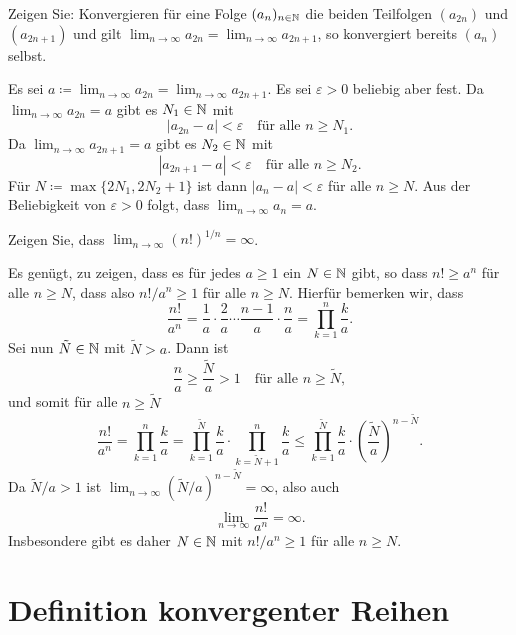 \documentclass[a4paper,10pt]{article}
\begin{document}
\begin{question}
 Zeigen Sie: Konvergieren für eine Folge $(a_n)_{n \in \mathbb{N}}$ die beiden Teilfolgen $(a_{2n})$ und $(a_{2n+1})$ und gilt $\lim_{n \to \infty} a_{2n} = \lim_{n \to \infty} a_{2n+1}$, so konvergiert bereits $(a_n)$ selbst.
\end{question}
\begin{solution}
 Es sei $a \coloneqq \lim_{n \to \infty} a_{2n} = \lim_{n \to \infty} a_{2n+1}$. Es sei $\varepsilon > 0$ beliebig aber fest. Da $\lim_{n \to \infty} a_{2n} = a$ gibt es $N_1 \in \mathbb{N}$ mit
 \[
  |a_{2n} - a| < \varepsilon \quad \text{für alle $n \geq N_1$}.
 \]
 Da $\lim_{n \to \infty} a_{2n+1} = a$ gibt es $N_2 \in \mathbb{N}$ mit
 \[
  |a_{2n+1} - a| < \varepsilon \quad \text{für alle $n \geq N_2$}.
 \]
 Für $N \coloneqq \max \{2N_1, 2N_2+1\}$ ist dann $|a_n - a| < \varepsilon$ für alle $n \geq N$. Aus der Beliebigkeit von $\varepsilon > 0$ folgt, dass $\lim_{n \to \infty} a_n = a$.
\end{solution}


\begin{question}
 Zeigen Sie, dass $\lim_{n \to \infty} (n!)^{1/n} = \infty$.
\end{question}
\begin{solution}
 Es genügt, zu zeigen, dass es für jedes $a \geq 1$ ein $N \in \mathbb{N}$ gibt, so dass $n! \geq a^n$ für alle $n \geq N$, dass also $n!/a^n \geq 1$ für alle $n \geq N$. Hierfür bemerken wir, dass
 \[
  \frac{n!}{a^n}
  = \frac{1}{a} \cdot \frac{2}{a} \dotsm \frac{n-1}{a} \cdot \frac{n}{a}
  = \prod_{k=1}^n \frac{k}{a}.
 \]
 Sei nun $\tilde{N} \in \mathbb{N}$ mit $\tilde{N} > a$. Dann ist
 \[
  \frac{n}{a} \geq \frac{\tilde{N}}{a} > 1 \quad \text{für alle $n \geq \tilde{N}$},
 \]
 und somit für alle $n \geq \tilde{N}$
 \[
  \frac{n!}{a^n}
  = \prod_{k=1}^{n} \frac{k}{a}
  = \prod_{k=1}^{\tilde{N}} \frac{k}{a} \cdot \prod_{k=\tilde{N}+1}^n \frac{k}{a}
  \leq \prod_{k=1}^{\tilde{N}} \frac{k}{a} \cdot \left(\frac{\tilde{N}}{a}\right)^{n-\tilde{N}}.
 \]
 Da $\tilde{N}/a > 1$ ist $\lim_{n \to \infty} (\tilde{N}/a)^{n-\tilde{N}} = \infty$, also auch
 \[
  \lim_{n \to \infty} \frac{n!}{a^n} = \infty.
 \]
 Insbesondere gibt es daher $N \in \mathbb{N}$ mit $n!/a^n \geq 1$ für alle $n \geq N$.
\end{solution}





\section{Definition konvergenter Reihen}
\end{document}
